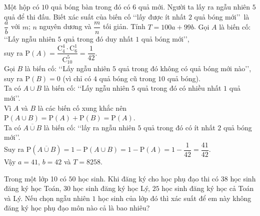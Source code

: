 \begin{bt}%
Một hộp có $10$ quả bóng bàn trong đó có $6$ quả mới. Người ta lấy ra ngẫu nhiên $5$ quả để thi đấu. Biết xác suất của biến cố \lq\lq lấy được ít nhất $2$ quả bóng mới\rq\rq\ là $\dfrac{a}{b}$ với $m$; $n$ nguyên dương và $\dfrac{m}{n}$ tối giản. Tính $T=100a+99b$.
\loigiai
{
Gọi $A$ là biến cố: \lq\lq Lấy ngẫu nhiên $5$ quả trong đó duy nhất $1$ quả bóng mới\rq\rq, \\
suy ra $\mathrm{P}(A)=\dfrac{\mathrm{C}_{4}^{4}\cdot\mathrm{C}_{6}^{1}}{\mathrm{C}_{10}^{5}}=\dfrac{1}{42}$.\\
Gọi $B$ là biến cố: \lq\lq Lấy ngẫu nhiên $5$ quả trong đó không có quả bóng mới nào\rq\rq, \\
suy ra $\mathrm{P}(B)=0$ (vì chỉ có $4$ quả bóng cũ trong $10$ quả bóng).\\
Ta có $A\cup B$ là biến cố: \lq\lq Lấy ngẫu nhiên $5$ quả trong đó có nhiều nhất $1$ quả mới\rq\rq. \\
Vì $A$ và $B$ là các biến cố xung khắc nên $\mathrm{P}(A\cup B)=\mathrm{P}(A)+\mathrm{P}(B)=\mathrm{P}(A)$.\\
Ta có $\overline{A\cup B}$ là biến cố: \lq\lq lấy ra ngẫu nhiên $5$ quả trong đó có ít nhất $2$ quả bóng mới\rq\rq.\\
Suy ra $\mathrm{P}\left(\overline{A\cup B}\right)=1-\mathrm{P}(A\cup B)=1-\mathrm{P}(A)=1-\dfrac{1}{42}=\dfrac{41}{42}$. \\
Vậy $a=41$, $b=42$ và $T=8258$.
}
\end{bt}

\begin{bt}%
 
    Trong một lớp 10 có $50$ học sinh. Khi đăng ký cho học phụ đạo thi có $38$ học sinh đăng ký học Toán, $30$ học sinh đăng ký học Lý, $25$ học sinh đăng ký học cả Toán và Lý. Nếu chọn ngẫu nhiên $1$ học sinh của lớp đó thì xác suất để em này không đăng ký học phụ đạo môn nào cả là bao nhiêu?
\end{bt}

